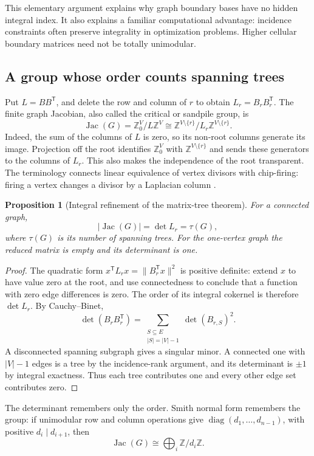 \documentclass[11pt]{article}
\newtheorem{proposition}[theorem]{Proposition}
\theoremstyle{definition}
\theoremstyle{remark}
\newcommand{\Z}{\mathbb Z}
\begin{document}
This elementary argument explains why graph boundary bases have no hidden
integral index.  It also explains a familiar computational advantage:
incidence constraints often preserve integrality in optimization problems.
Higher cellular boundary matrices need not be totally unimodular.

\subsection{A group whose order counts spanning trees}

Put \(L=BB^{\mathsf T}\), and delete the row and column of \(r\) to obtain
\(L_r=B_rB_r^{\mathsf T}\).  The finite graph Jacobian, also called the
critical or sandpile group, is
\[
 \operatorname{Jac}(G)=\Z^V_0/L\Z^V
       \cong\Z^{V\setminus\{r\}}/L_r\Z^{V\setminus\{r\}}.
\]
Indeed, the sum of the columns of \(L\) is zero, so its non-root columns
generate its image.  Projection off the root identifies \(\Z^V_0\) with
\(\Z^{V\setminus\{r\}}\) and sends these generators to the columns of
\(L_r\).  This also makes the independence of the root transparent.
The terminology connects linear equivalence of vertex divisors with
chip-firing: firing a vertex changes a divisor by a Laplacian column
\cite{gih-levine-tree}.

\begin{proposition}[Integral refinement of the matrix-tree theorem]
For a connected graph,
\[
 |\operatorname{Jac}(G)|=\det L_r=\tau(G),
\]
where \(\tau(G)\) is its number of spanning trees.  For the one-vertex
graph the reduced matrix is empty and its determinant is one.
\end{proposition}
\begin{proof}
The quadratic form \(x^{\mathsf T}L_rx=\|B_r^{\mathsf T}x\|^2\) is
positive definite: extend \(x\) to have value zero at the root, and use
connectedness to conclude that a function with zero edge differences is
zero.  The order of its integral cokernel is therefore \(\det L_r\).
By Cauchy--Binet,
\[
 \det(B_rB_r^{\mathsf T})
 =\sum_{\substack{S\subseteq E\\|S|=|V|-1}}\det(B_{r,S})^2.
\]
A disconnected spanning subgraph gives a singular minor.  A connected
one with \(|V|-1\) edges is a tree by the incidence-rank argument, and
its determinant is \(\pm1\) by integral exactness.  Thus each tree
contributes one and every other edge set contributes zero.
\end{proof}

The determinant remembers only the order.  Smith normal form remembers
the group: if unimodular row and column operations give
\(\operatorname{diag}(d_1,\ldots,d_{n-1})\), with positive
\(d_i\mid d_{i+1}\), then
\[
 \operatorname{Jac}(G)\cong\bigoplus_i\Z/d_i\Z.
\]
\end{document}
